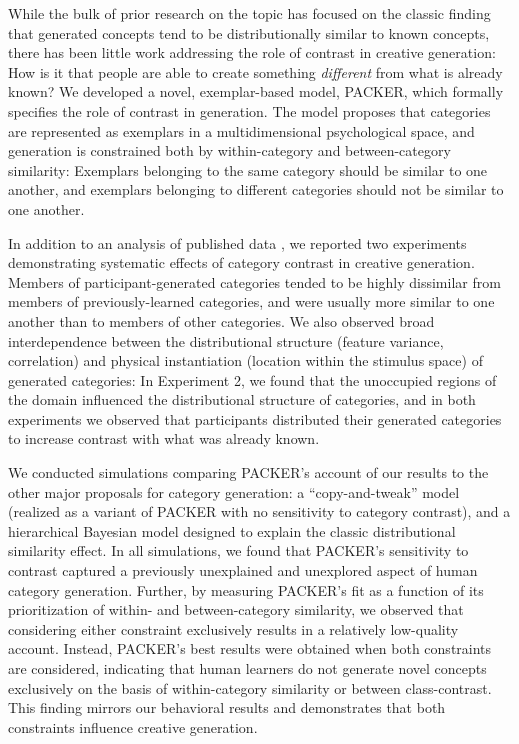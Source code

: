 \documentclass[12pt]{article}
\begin{document}
\begin{flushleft}
While the bulk of prior research on the topic has focused on the classic finding that generated concepts tend to be distributionally similar to known concepts, there has been little work addressing the role of contrast in creative generation: How is it that people are able to create something {\em different} from what is already known? We developed a novel, exemplar-based model, PACKER, which formally specifies the role of contrast in generation. The model proposes that categories are represented as exemplars in a multidimensional psychological space, and generation is constrained both by within-category and between-category similarity: Exemplars belonging to the same category should be similar to one another, and exemplars belonging to different categories should not be similar to one another. 

In addition to an analysis of published data \citep[][Experiment 3]{jern2013probabilistic}, we reported two experiments demonstrating systematic effects of category contrast in creative generation. Members of participant-generated categories tended to be highly dissimilar from members of previously-learned categories, and were usually more similar to one another than to members of other categories. We also observed broad interdependence between the distributional structure (feature variance, correlation) and physical instantiation (location within the stimulus space) of generated categories: In Experiment 2, we found that the unoccupied regions of the domain influenced the distributional structure of categories, and in both experiments we observed that participants distributed their generated categories to increase contrast with what was already known. 

We conducted simulations comparing PACKER's account of our results to the other major proposals for category generation: a ``copy-and-tweak'' model (realized as a variant of PACKER with no sensitivity to category contrast), and a hierarchical Bayesian model designed to explain the classic distributional similarity effect. In all simulations, we found that PACKER's sensitivity to contrast captured a previously unexplained and unexplored aspect of human category generation. Further, by measuring PACKER's fit as a function of its prioritization of within- and between-category similarity, we observed that considering either constraint exclusively results in a relatively low-quality account. Instead, PACKER's best results were obtained when both constraints are considered, indicating that human learners do not generate novel concepts exclusively on the basis of within-category similarity or between class-contrast. This finding mirrors our behavioral results and demonstrates that both constraints influence creative generation. 


\end{flushleft}
\end{document}
